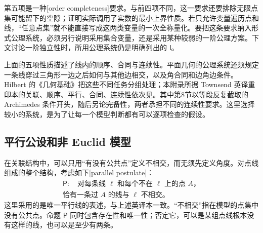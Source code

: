 \ProseParagraphBreak

第五项是一种[order completeness]要求。与前四项不同，这一要求还要排除无限点集可能留下的空隙；证明实际调用了实数的最小上界性质。若只允许变量遍历点和线，“任意点集”就不能直接写成这两类变量的一次全称量化。要把这条要求纳入形式公理系统，必须另行说明采用集合变量，还是采用某种较弱的一阶公理方案。下文讨论一阶独立性时，所用公理系统仍是明确列出的 \(\mathsf I\)。

\ProseParagraphBreak

上面的五项性质描述了线内的顺序、合同与连续性。平面几何的公理系统还须规定一条线穿过三角形一边之后如何与其他边相交，以及角合同和边角边条件。Hilbert 的《几何基础》把这些不同任务分组处理；本附录所据 Townsend 英译重印本的关联、顺序、平行、合同、连续性依次见\cite[第I章第2--8节]{Hilbert1950Foundations}。其中第8节以等段反复截取的 Archimedes 条件开头，随后另论完备性，两者承担不同的连续性要求。这里选择较小的系统，是为了让每一个模型判断都有可以逐项检查的假设。

\subsection{平行公设和非 Euclid 模型}
\label{g1:subsec:A01:02}

在关联结构中，可以只用“有没有公共点”定义不相交，而无须先定义角度。对点线组成的整个结构，考虑如下[parallel postulate]：
\[
	\begin{gathered}
		\mathsf P:\quad\text{对每条线 \(\ell\) 和每个不在 \(\ell\) 上的点 \(A\)，}\\
		\text{恰有一条过 \(A\) 的线与 \(\ell\) 不相交。}
	\end{gathered}
\]
这里采用的是唯一平行线的表述，与上述英译本\cite[第I章第5节]{Hilbert1950Foundations}一致。“不相交”指在模型的点集中没有公共点。命题 \(\mathsf P\) 同时包含存在性和唯一性；否定它，可以是某组点线根本没有这样的线，也可以是至少有两条。

